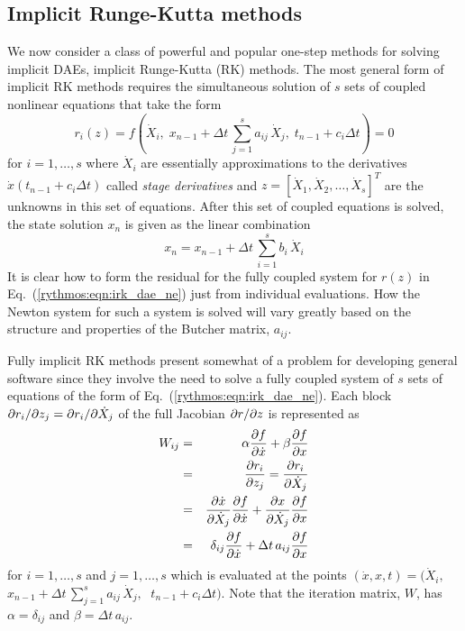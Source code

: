 
\subsection{Implicit Runge-Kutta methods\label{rythmos:sec:Implicit-Runge-Kutta-methods}}

We now consider a class of powerful and popular one-step methods for
solving implicit DAEs, implicit Runge-Kutta (RK) methods. The most
general form of implicit RK methods requires the simultaneous solution
of $s$ sets of coupled nonlinear equations that take the form
\begin{equation}
r_{i}(z)=f\left(\dot{X}_{i},\; x_{n-1}+\Delta t\,\sum_{j=1}^{s}a_{ij}\,\dot{X}_{j},\; t_{n-1}+c_{i}\Delta t\right)=0\label{rythmos:eqn:irk_dae_ne}
\end{equation}
for $i=1,\ldots,s$ where $\dot{X}_{i}$ are essentially approximations
to the derivatives $\dot{x}(t_{n-1}+c_{i}\Delta t)$ called \emph{stage
derivatives} and $z=[\dot{X}_{1},\dot{X}_{2},\ldots,\dot{X}_{s}]^{T}$
are the unknowns in this set of equations. After this set of coupled
equations is solved, the state solution $x_{n}$ is given as the linear
combination
\[
x_{n}=x_{n-1}+\Delta t\,\sum_{i=1}^{s}b_{i}\,\dot{X}_{i}
\]
It is clear how to form the residual for the fully coupled system
for $r(z)$ in Eq.~(\ref{rythmos:eqn:irk_dae_ne}) just from individual
evaluations. How the Newton system for such a system is solved will
vary greatly based on the structure and properties of the Butcher
matrix, $a_{ij}$. 

Fully implicit RK methods present somewhat of a problem for developing
general software since they involve the need to solve a fully coupled
system of $s$ sets of equations of the form of Eq.~(\ref{rythmos:eqn:irk_dae_ne}).
Each block $\partial r_{i} / \partial z_{j}=\partial r_{i} / \partial \dot{X}_{j}$ of the full
Jacobian $\partial r / \partial z$ is represented as 
\begin{eqnarray}
W_{ij} & = & \alpha\displaystyle{\frac{\partial f}{\partial \dot{x}}}+\beta\displaystyle{\frac{\partial f}{\partial x}}\nonumber \\
 & = & \displaystyle{\frac{\partial r_{i}}{\partial z_{j}}}=\displaystyle{\frac{\partial r_{i}}{\partial \dot{X}_{j}}}\nonumber \\
 & = & \frac{\partial\dot{x}}{\partial\dot{X}_{j}}\displaystyle{\frac{\partial f}{\partial \dot{x}}}+\frac{\partial x}{\partial\dot{X}_{j}}\displaystyle{\frac{\partial f}{\partial x}}\nonumber \\
 & = & \delta_{ij}\displaystyle{\frac{\partial f}{\partial \dot{x}}}+\Delta t\, a_{ij}\displaystyle{\frac{\partial f}{\partial x}}\label{rythmos:eq:dridzj_IRK}
\end{eqnarray}
for $i=1,\ldots,s$ and $j=1,\ldots,s$ which is evaluated at the
points $(\dot{x},x,t)=(\dot{X}_{i},\;$ $x_{n-1}+\Delta t\,\sum_{j=1}^{s}a_{ij}\,\dot{X}_{j},\;$
$t_{n-1}+c_{i}\Delta t)$. Note that the iteration matrix, $W$, has
$\alpha=\delta_{ij}$ and $\beta=\Delta t\, a_{ij}$.

